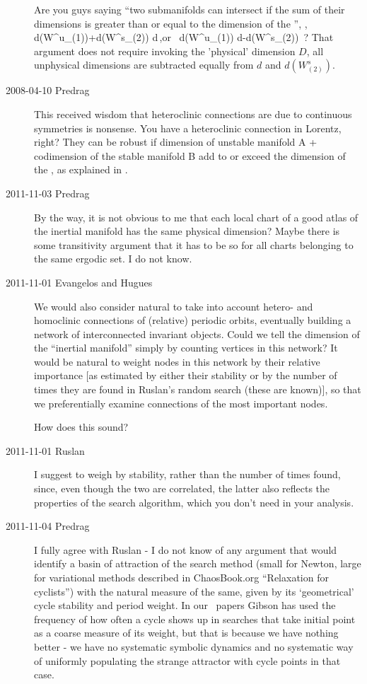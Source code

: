 \begin{description}
Are you guys saying ``two submanifolds can intersect if the sum of their
dimensions is greater than or equal to the dimension of the {\statesp}'',
\ie,
\beq
d(W^u_{(1)})+d(W^s_{(2)}) \geq d\,,\quad \mbox{or }
d(W^u_{(1)}) \geq d-d(W^s_{(2)})
\,?
That argument does not require invoking the 'physical' dimension $D$, all
unphysical dimensions are subtracted equally from $ d$ and $d(W^s_{(2)})$.

\item[2008-04-10 Predrag]
    This received wisdom that heteroclinic connections are due to
    continuous symmetries is nonsense. You have a heteroclinic connection
    in Lorentz, right? They can be robust if dimension of unstable
    manifold A + codimension of the stable manifold B add to or exceed
    the dimension of the \statesp, as explained in .

\item[2011-11-03 Predrag] By the way, it is not obvious to me that each local
chart of a good atlas of the inertial manifold has the same physical dimension?
Maybe there is some transitivity argument that it has to be so for all
charts belonging to the same ergodic set. I do not know.

\item[2011-11-01 Evangelos and Hugues]
We would also consider natural to take into account hetero- and
homoclinic connections of (relative) periodic orbits, eventually building
a network of interconnected invariant objects. Could we tell the
dimension of the ``inertial manifold'' simply by counting vertices in
this network? It would be natural to weight nodes in this network by
their relative importance [as estimated by either their stability or by
the number of times they are found in Ruslan's random search (these are
known)], so that we preferentially examine connections of the most
important nodes.

How does this sound?

\item[2011-11-01 Ruslan] I suggest to weigh by stability, rather than
the number of times found, since, even though the two are correlated, the
latter also reflects the properties of the search algorithm, which you
don't need in your analysis.

\item[2011-11-04 Predrag] I fully agree with Ruslan - I do not know of
any argument that would identify a basin of attraction of the search
method (small for Newton, large for variational methods described in
ChaosBook.org ``Relaxation for cyclists'') with the natural measure of
the same, given by its `geometrical' cycle stability and period weight.
In our \pCf\ papers Gibson has used the frequency of how often a cycle
shows up in searches that take initial point as a coarse measure of its
weight, but that is because we have nothing better - we have no
systematic symbolic dynamics and no systematic way of uniformly
populating the strange attractor with cycle points in that case.


\end{description}
